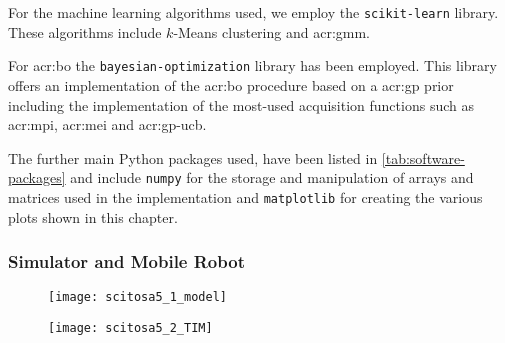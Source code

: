 For the machine learning algorithms used, we employ the \texttt{scikit-learn} library. These algorithms include $k$-Means clustering and \acrfull{acr:gmm}.

For \acrlong{acr:bo} the \texttt{bayesian-optimization} library \cite{nogueirabayesianoptimization} has been employed. This library offers an implementation of the \acrshort{acr:bo} procedure based on a \acrshort{acr:gp} prior including the implementation of the most-used acquisition functions such as \acrshort{acr:mpi}, \acrshort{acr:mei} and \acrshort{acr:gp-ucb}.

The further main Python packages used, have been listed in \autoref{tab:software-packages} and include \texttt{numpy} for the storage and manipulation of arrays and matrices used in the implementation and \texttt{matplotlib} for creating the various plots shown in this chapter.

\subsubsection{Simulator and Mobile Robot}
\label{sec:simulator}

\begin{figure}[t]
\centering
\begin{minipage}{0.4\textwidth}
	\centering
	\texttt{[image: scitosa5\_1\_model]}
	\label{fig:scitosa5}
\end{minipage}
\qquad
\begin{minipage}{0.4\textwidth}
	\centering
	\vspace{23pt}
	\texttt{[image: scitosa5\_2\_TIM]}
	\vspace{-10pt}
	\label{fig:scitosa5_2}
\end{minipage}
\end{figure}

